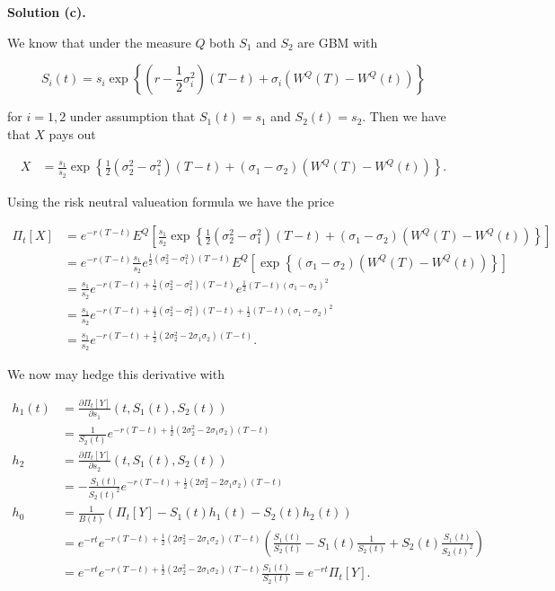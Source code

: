 \documentclass[
]{book}
\begin{document}
\textbf{Solution (c).}

We know that under the measure \(Q\) both \(S_1\) and \(S_2\) are GBM with

\[
S_i(t)=s_i\exp\left\{\left(r-\frac{1}{2}\sigma_i^2\right)(T-t)+\sigma_i (W^Q(T)-W^Q(t))\right\}
\]

for \(i=1,2\) under assumption that \(S_1(t)=s_1\) and \(S_2(t)=s_2\). Then we have that \(X\) pays out

\begin{align*}
X&=\frac{s_1}{s_2}\exp\left\{\frac{1}{2}\left(\sigma_2^2-\sigma_1^2\right)(T-t)+(\sigma_1-\sigma_2) (W^Q(T)-W^Q(t))\right\}.
\end{align*}

Using the risk neutral valueation formula we have the price

\begin{align*}
\Pi_t[X]&=e^{-r(T-t)}E^Q\left[\frac{s_1}{s_2}\exp\left\{\frac{1}{2}\left(\sigma_2^2-\sigma_1^2\right)(T-t)+(\sigma_1-\sigma_2) (W^Q(T)-W^Q(t))\right\}\right]\\
&=e^{-r(T-t)}\frac{s_1}{s_2}e^{\frac{1}{2}\left(\sigma_2^2-\sigma_1^2\right)(T-t)}E^Q\left[\exp\left\{(\sigma_1-\sigma_2) (W^Q(T)-W^Q(t))\right\}\right]\\
&=\frac{s_1}{s_2}e^{-r(T-t)+\frac{1}{2}\left(\sigma_2^2-\sigma_1^2\right)(T-t)}e^{\frac{1}{2}(T-t)(\sigma_1-\sigma_2)^2}\\
&=\frac{s_1}{s_2}e^{-r(T-t)+\frac{1}{2}\left(\sigma_2^2-\sigma_1^2\right)(T-t)+\frac{1}{2}(T-t)(\sigma_1-\sigma_2)^2}\\
&=\frac{s_1}{s_2}e^{-r(T-t)+\frac{1}{2}\left(2\sigma_2^2-2\sigma_1\sigma_2\right)(T-t)}.
\end{align*}

We now may hedge this derivative with

\begin{align*}
h_1(t)&=\frac{\partial \Pi_t[Y]}{\partial s_1}(t,S_1(t),S_2(t))\\
&=\frac{1}{S_2(t)}e^{-r(T-t)+\frac{1}{2}\left(2\sigma_2^2-2\sigma_1\sigma_2\right)(T-t)}\\
h_2&=\frac{\partial \Pi_t[Y]}{\partial s_2}(t,S_1(t),S_2(t))\\
&=-\frac{S_1(t)}{S_2(t)^2}e^{-r(T-t)+\frac{1}{2}\left(2\sigma_2^2-2\sigma_1\sigma_2\right)(T-t)}\\
h_0&=\frac{1}{B(t)}\left(\Pi_t[Y]-S_1(t)h_1(t)-S_2(t)h_2(t)\right)\\
&=e^{-rt}e^{-r(T-t)+\frac{1}{2}\left(2\sigma_2^2-2\sigma_1\sigma_2\right)(T-t)}\left(\frac{S_1(t)}{S_2(t)}-S_1(t)\frac{1}{S_2(t)}+S_2(t)\frac{S_1(t)}{S_2(t)^2}\right)\\
&=e^{-rt}e^{-r(T-t)+\frac{1}{2}\left(2\sigma_2^2-2\sigma_1\sigma_2\right)(T-t)}\frac{S_1(t)}{S_2(t)}=e^{-rt}\Pi_t[Y].
\end{align*}
\end{document}
